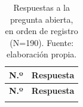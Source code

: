 {
\footnotesize
\singlespacing
\setlength{\tabcolsep}{5pt}
\renewcommand{\arraystretch}{1.1}
\begin{longtable}{r >{\raggedright\arraybackslash}p{13.6cm}}
	\caption{Respuestas a la pregunta abierta, en orden de registro (N=190). Fuente: elaboración propia.}
	\label{tab:encuesta-abierta}\\
	\hline
	\textbf{N.º} & \textbf{Respuesta} \\
	\hline
	\endfirsthead
	\hline
	\textbf{N.º} & \textbf{Respuesta} \\
	\hline
	\endhead
	\hline
	\endfoot
	
\end{longtable}
}
